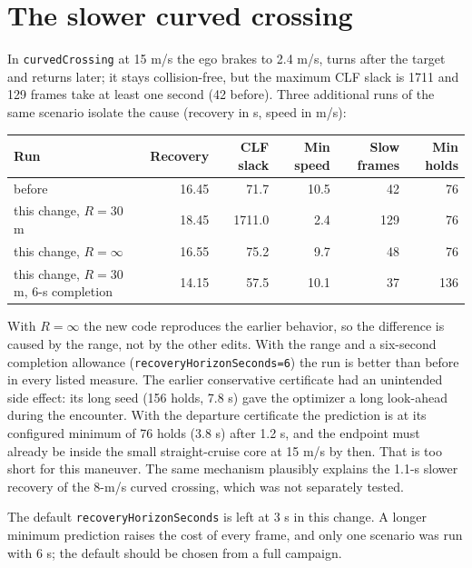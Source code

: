 \documentclass[11pt]{article}
\begin{document}
\section{The slower curved crossing}\label{sec:regression}
In \texttt{curvedCrossing} at 15 m/s the ego brakes to 2.4 m/s, turns after
the target and returns later; it stays collision-free, but the maximum CLF
slack is 1711 and 129 frames take at least one second (42 before). Three
additional runs of the same scenario isolate the cause (recovery in s, speed in m/s):
\begin{center}
\begin{tabular}{lrrrrr}
\toprule
Run & Recovery & CLF slack & Min speed & Slow frames & Min holds \\
\midrule
before & 16.45 & 71.7 & 10.5 & 42 & 76 \\
this change, $R=30$ m & 18.45 & 1711.0 & 2.4 & 129 & 76 \\
this change, $R=\infty$ & 16.55 & 75.2 & 9.7 & 48 & 76 \\
this change, $R=30$ m, 6-s completion & 14.15 & 57.5 & 10.1 & 37 & 136 \\
\bottomrule
\end{tabular}
\end{center}
With $R=\infty$ the new code reproduces the earlier behavior, so the
difference is caused by the range, not by the other edits. With the range and
a six-second completion allowance (\texttt{recoveryHorizonSeconds=6}) the run
is better than before in every listed measure. The earlier conservative
certificate had an unintended side effect: its long seed (156 holds, 7.8 s)
gave the optimizer a long look-ahead during the encounter. With the departure
certificate the prediction is at its configured minimum of 76 holds (3.8 s)
after 1.2 s, and the endpoint must already be inside the small straight-cruise
core at 15 m/s by then. That is too short for this maneuver. The same
mechanism plausibly explains the 1.1-s slower recovery of the 8-m/s curved
crossing, which was not separately tested.

The default \texttt{recoveryHorizonSeconds} is left at 3 s in this change. A
longer minimum prediction raises the cost of every frame, and only one
scenario was run with 6 s; the default should be chosen from a full campaign.
\end{document}
